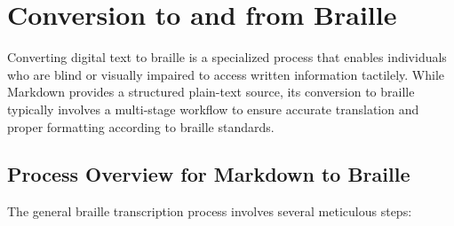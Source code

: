 \section{Conversion to and from Braille}
\label{sec:markdown-braille}

Converting digital text to braille is a specialized process that enables individuals who are blind or visually impaired to access written information tactilely. While Markdown provides a structured plain-text source, its conversion to braille typically involves a multi-stage workflow to ensure accurate translation and proper formatting according to braille standards.

\subsection{Process Overview for Markdown to Braille}
The general braille transcription process involves several meticulous steps:
